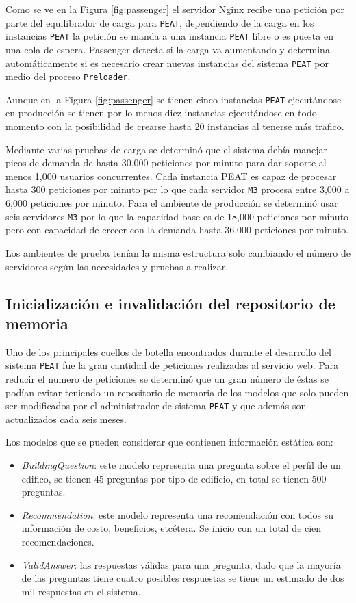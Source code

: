 
Como se ve en la Figura \ref{fig:passenger} el servidor Nginx recibe una petición
por parte del equilibrador de carga para \texttt{PEAT}, dependiendo de la carga
en los instancias \texttt{PEAT} la petición se manda a una instancia \texttt{PEAT}
libre o es puesta en una cola de espera. Passenger detecta si la carga va aumentando
y determina automáticamente si es necesario crear nuevas instancias del sistema
\texttt{PEAT} por medio del proceso \texttt{Preloader}.

Aunque en la Figura \ref{fig:passenger} se tienen cinco instancias \texttt{PEAT}
ejecutándose en producción se tienen por lo menos diez instancias ejecutándose en
todo momento con la posibilidad de crearse hasta 20 instancias al tenerse más
trafico.

Mediante varias pruebas de carga se determinó que el sistema debía manejar picos
de demanda de hasta 30,000 peticiones por minuto para dar soporte al menos
1,000 usuarios concurrentes. Cada instancia PEAT es capaz de procesar hasta
300 peticiones por minuto por lo que cada servidor \texttt{M3} procesa entre
3,000 a 6,000 peticiones por minuto. Para el ambiente de producción se determinó
usar seis servidores \texttt{M3} por lo que la capacidad base es de 18,000
peticiones por minuto pero con capacidad de crecer con la demanda hasta
36,000 peticiones por minuto.

Los ambientes de prueba tenían la misma estructura solo cambiando el número
de servidores según las necesidades y pruebas a realizar.

\subsection{Inicialización e invalidación del repositorio de memoria}

Uno de los principales cuellos de botella encontrados durante el desarrollo
del sistema \texttt{PEAT} fue la gran cantidad de peticiones realizadas al
servicio web. Para reducir el numero de peticiones se determinó que un gran
número de éstas se podían evitar teniendo un repositorio de memoria de los modelos
que solo pueden ser modificados por el administrador de sistema \texttt{PEAT}
y que además son actualizados cada seis meses. 

Los modelos que se pueden considerar que contienen información estática son:
\begin{itemize}
\item \textit{BuildingQuestion}: este modelo representa una pregunta sobre
  el perfil de un edifico, se tienen 45 preguntas por tipo de edificio, en
  total se tienen 500 preguntas.
\item \textit{Recommendation}: este modelo representa una recomendación
  con todos su información de costo, beneficios, etcétera. Se inicio con un
  total de cien recomendaciones.
\item \textit{ValidAnswer}: las respuestas válidas para una pregunta, dado
  que la mayoría de las preguntas tiene cuatro posibles respuestas se tiene
  un estimado de dos mil respuestas en el sistema.
\end{itemize}

